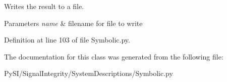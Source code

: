 Writes the result to a file. 


\begin{DoxyParams}{Parameters}
{\em name} & filename for file to write \\
\hline
\end{DoxyParams}


Definition at line 103 of file Symbolic.\+py.



The documentation for this class was generated from the following file\+:\begin{DoxyCompactItemize}
\item 
Py\+S\+I/\+Signal\+Integrity/\+System\+Descriptions/Symbolic.\+py\end{DoxyCompactItemize}
